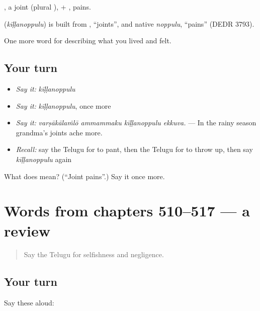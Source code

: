 , a joint (plural ), + , pains.

\begin{cousinweb}
\textbf{} (\emph{kīḷḷanoppulu}) is built from , \textquotedblleft{}joints\textquotedblright{}, and native \emph{noppulu}, \textquotedblleft{}pains\textquotedblright{} (DEDR 3793).
\end{cousinweb}

\begin{grammarlens}[title={What you've built}]
One more word for describing what you lived and felt.
\end{grammarlens}

\subsection*{Your turn}
\begin{itemize}
\raggedright
  \item \emph{Say it:} \emph{kīḷḷanoppulu}
  \item \emph{Say it:} \emph{kīḷḷanoppulu}, once more
  \item \emph{Say it:} \emph{varṣākālaṁlō ammammaku kīḷḷanoppulu ekkuva.} — In the rainy season grandma's joints ache more.
  \item \emph{Recall:} say the Telugu for to pant, then the Telugu for to throw up, then say \emph{kīḷḷanoppulu} again
\end{itemize}

\begin{tcolorbox}[breakable,colback=teal!4,colframe=teal!35!black,title={Before you move on}]
What does  mean? (\textquotedblleft{}Joint pains\textquotedblright{}.) Say it once more.
\end{tcolorbox}
\section[(dialogue)]{Words from chapters 510–517 — a review}

\label{lesson:TE-R517-review-510-517}



\begin{quote}
Say the Telugu for selfishness and negligence.
\end{quote}

\subsection*{Your turn}
Say these aloud:

